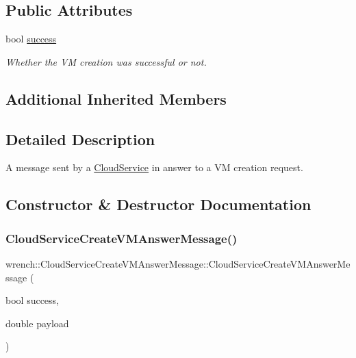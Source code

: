 \subsection*{Public Attributes}
\begin{DoxyCompactItemize}
\item 
\mbox{\label{classwrench_1_1_cloud_service_create_v_m_answer_message_a9e641b442aa8543283bc63fc83df7f0d}} 
bool \hyperlink{classwrench_1_1_cloud_service_create_v_m_answer_message_a9e641b442aa8543283bc63fc83df7f0d}{success}
\begin{DoxyCompactList}\small\item\em Whether the VM creation was successful or not. \end{DoxyCompactList}\end{DoxyCompactItemize}
\subsection*{Additional Inherited Members}


\subsection{Detailed Description}
A message sent by a \hyperlink{classwrench_1_1_cloud_service}{Cloud\+Service} in answer to a VM creation request. 

\subsection{Constructor \& Destructor Documentation}
\mbox{\label{classwrench_1_1_cloud_service_create_v_m_answer_message_ad2584bdb77a7016cbd93461c32b8ec1e}} 
\subsubsection{\texorpdfstring{Cloud\+Service\+Create\+V\+M\+Answer\+Message()}{CloudServiceCreateVMAnswerMessage()}}
{\footnotesize\ttfamily wrench\+::\+Cloud\+Service\+Create\+V\+M\+Answer\+Message\+::\+Cloud\+Service\+Create\+V\+M\+Answer\+Message (\begin{DoxyParamCaption}\item[{bool}]{success,  }\item[{double}]{payload }\end{DoxyParamCaption})}



